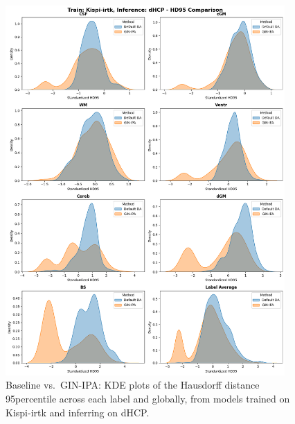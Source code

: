 \begin{figure}[htbp]
    \centering
    \includegraphics[width=0.95\textwidth]{figures/1_irtk-dhcp_HD.png}
    \caption{Baseline vs.\ GIN-IPA: KDE plots of the Hausdorff distance 95\th percentile across each label and globally, from models trained on Kispi-irtk and inferring on dHCP.}
    \label{fig:1_irtk_dhcp_HD}
\end{figure}
